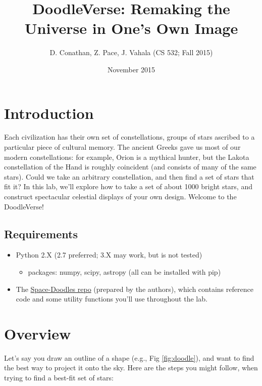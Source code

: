 \documentclass{article}
\title{DoodleVerse: Remaking the Universe in One's Own Image}
\author{D. Conathan, Z. Pace, J. Vahala (CS 532; Fall 2015)}
\date{November 2015}
\begin{document}
\maketitle

\section{Introduction}

Each civilization has their own set of constellations, groups of stars ascribed to a particular piece of cultural memory. The ancient Greeks gave us most of our modern constellations: for example, Orion is a mythical hunter, but the Lakota constellation of the Hand is roughly coincident (and consists of many of the same stars). Could we take an arbitrary constellation, and then find a set of stars that fit it? In this lab, we'll explore how to take a set of about 1000 bright stars, and construct spectacular celestial displays of your own design. Welcome to the DoodleVerse!

\subsection*{Requirements}

\begin{itemize}
\item Python 2.X (2.7 preferred; 3.X may work, but is not tested)
  \begin{itemize}
  \item packages: numpy, scipy, astropy (all can be installed with pip)
  \end{itemize}
\item The \href{https://github.com/jvahala/Space-Doodles}{Space-Doodles repo} (prepared by the authors), which contains reference code and some utility functions you'll use throughout the lab.
\end{itemize}

\section{Overview}

Let's say you draw an outline of a shape (e.g., Fig \ref{fig:doodle}), and want to find the best way to project it onto the sky. Here are the steps you might follow, when trying to find a best-fit set of stars:
\end{document}
